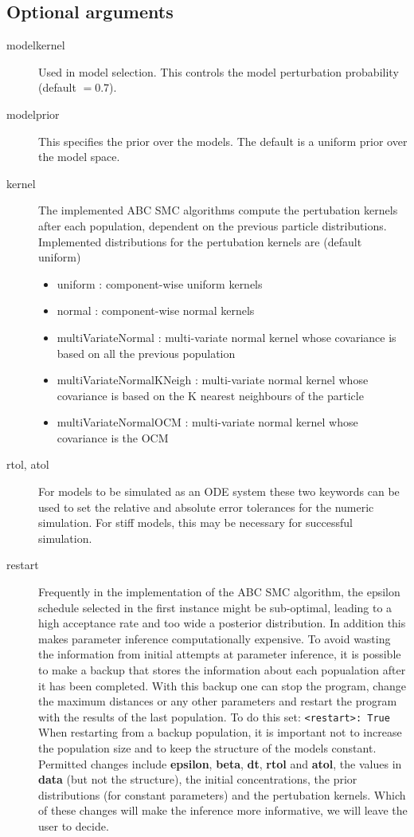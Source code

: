 \documentclass[a4paper]{report}
\begin{document}
\subsection{Optional arguments}
\begin{description}
\item[modelkernel] Used in model selection. This controls the model perturbation probability (default $=0.7$).

\item[modelprior] This specifies the prior over the models. The default is a uniform prior over the model space.

\item[kernel] The implemented ABC SMC algorithms compute the pertubation kernels after each population, dependent on the previous particle distributions. Implemented distributions for the pertubation kernels are (default uniform)
\begin{itemize}
	\item uniform : component-wise uniform kernels 
	\item normal : component-wise normal kernels 
	\item multiVariateNormal : multi-variate normal kernel whose covariance is based on all the previous population
	\item multiVariateNormalKNeigh : multi-variate normal kernel whose covariance is based on the K nearest neighbours of the particle 
	\item multiVariateNormalOCM : multi-variate normal kernel whose covariance is the OCM 
\end{itemize}


\item[rtol, atol] For models to be simulated as an ODE system these two keywords can be used to set the relative and absolute error tolerances for the numeric simulation. For stiff models, this may be necessary for successful simulation.

\item[restart] Frequently in the implementation of the ABC SMC algorithm, the epsilon schedule selected in the first instance might be sub-optimal, leading to a high acceptance rate and too wide a posterior distribution. In addition this makes parameter inference computationally expensive. To avoid wasting the information from initial attempts at parameter inference, it is possible to make a backup that stores the information about each popualation after it has been completed. With this backup one can stop the program, change the maximum distances or any other parameters and restart the program with the results of the last population. To do this set: \verb$<restart>: True$ When restarting from a backup population, it is important not to increase the population size and to keep the structure of the models constant. Permitted changes include \textbf{epsilon}, \textbf{beta}, \textbf{dt}, \textbf{rtol} and \textbf{atol}, the values in \textbf{data} (but not the structure), the initial concentrations, the prior distributions (for constant parameters) and the pertubation kernels. Which of these changes will make the inference more informative, we will leave the user to decide.
\end{description}
\end{document}

